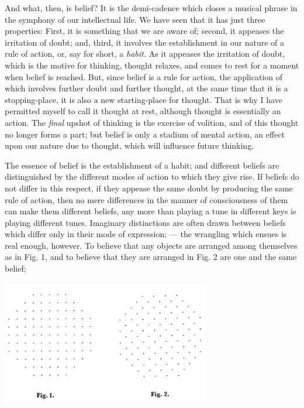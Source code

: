 And what, then, is belief? It is the demi-cadence which closes a musical phrase in the symphony of our intellectual life. We have seen that it has just three properties: First, it is something that we are aware of; second, it appeases the irritation of doubt; and, third, it involves the establishment in our nature of a rule of action, or, say for short, a \emph{habit.} As it appeases the irritation of doubt, which is the motive for thinking, thought relaxes, and comes to rest for a moment when belief is reached. But, since belief is a rule for action, the application of which involves further doubt and further thought, at the same time that it is a stopping-place, it is also a new starting-place for thought. That is why I have permitted myself to call it thought at rest, although thought is essentially an action. The \emph{final} upshot of thinking is the exercise of volition, and of this thought no longer forms a part; but belief is only a stadium of mental action, an effect upon our nature due to thought, which will influence future thinking.
 

The essence of belief is the establishment of a habit; and different  beliefs are distinguished by the different modes of action to which they give rise. If beliefs do not differ in this respect, if they appease the same doubt by producing the same rule of action, then no mere differences in the manner of consciousness of them can make them different beliefs, any more than playing a tune in different keys is playing different tunes. Imaginary distinctions are often drawn between beliefs which differ only in their mode of expression; --- the wrangling which ensues is real enough, however. To believe that any objects are arranged among themselves as in Fig. 1, and to believe that they are arranged in Fig. 2 are one and the same belief;

\centerline{\includegraphics[width=3.6in]{peirce-howto1.pdf}}


